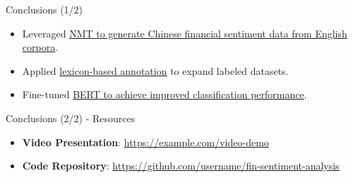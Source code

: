 \documentclass[aspectratio=169]{beamer}
\begin{document}
\begin{frame}{Conclusions (1/2)}
\begin{itemize}
  \item Leveraged \underline{NMT to generate Chinese financial sentiment data from English corpora}.
  \item Applied \underline{lexicon-based annotation} to expand labeled datasets.
  \item Fine-tuned \underline{BERT to achieve improved classification performance}.
\end{itemize}
\end{frame}

\begin{frame}{Conclusions (2/2) - Resources}
\begin{itemize}
  \item \textbf{Video Presentation}: \underline{\url{https://example.com/video-demo}}
  \item \textbf{Code Repository}: \underline{\url{https://github.com/username/fin-sentiment-analysis}}
\end{itemize}
\end{frame}
\end{document}
